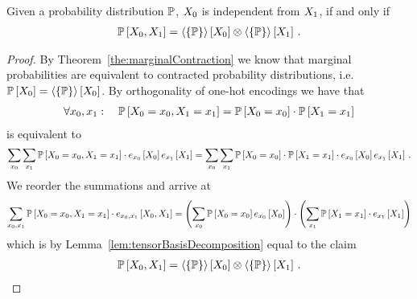 \begin{theorem}\label{the:independenceProductCriterion}
	Given a probability distribution $\mathbb{P}$, $X_{0}$ is independent from $X_{1}$, if and only if 
	\begin{align*}
		\mathbb{P}\left[X_{0},X_{1}\right] = \left\langle \{\mathbb{P}\}\right\rangle \left[ X_{0} \right] \otimes  \left\langle \{\mathbb{P}\}\right\rangle \left[ X_{1} \right] \, . 
	\end{align*}
\end{theorem}
\begin{proof}
	By Theorem~\ref{the:marginalContraction} we know that marginal probabilities are equivalent to contracted probability distributions, i.e. $\mathbb{P}\left[X_{0}\right] = \left\langle \{\mathbb{P}\}\right\rangle \left[ X_{0} \right] $.
	By orthogonality of one-hot encodings we have that
	\begin{align*}
		\forall x_{0}, x_{1} : \quad  \mathbb{P}\left[X_{0}=x_{0},X_{1}=x_{1}\right] 
		= \mathbb{P}\left[X_{0}=x_{0}\right]
		 \cdot 
		 \mathbb{P}\left[X_{1}=x_{1}\right] 
	\end{align*}
	is equivalent to 
	\begin{align*}
		\sum_{x_{0}}\sum_{x_{1}} \mathbb{P}\left[X_{0}=x_{0},X_{1}=x_{1}\right] \cdot e_{x_{0}}\left[X_{0}\right]e_{x_{1}}\left[X_{1}\right]
		= \sum_{x_{0}}\sum_{x_{1}} 
		\mathbb{P}\left[X_{0}=x_{0}\right]
		 \cdot 
		 \mathbb{P}\left[X_{1}=x_{1}\right] \cdot e_{x_{0}}\left[X_{0}\right]e_{x_{1}}\left[X_{1}\right] \, .
	\end{align*}
	We reorder the summations and arrive at
	\begin{align*}
		\sum_{x_{0},x_{1}} 
		\mathbb{P}\left[X_{0}=x_{0},X_{1}=x_{1}\right] \cdot e_{x_{0},x_{1}}\left[X_{0}, X_{1}\right]
		= \left(\sum_{x_{0}}\mathbb{P}\left[X_{0}=x_{0}\right] e_{x_{0}}\left[X_{0}\right] \right)
		\cdot 
		\left( \sum_{x_{1}}  \mathbb{P}\left[X_{1}=x_{1}\right] \cdot e_{x_{1}}\left[X_{1}\right]  \right) 
	\end{align*}
	which is by Lemma~\ref{lem:tensorBasisDecomposition} equal to the claim
	\begin{align*}
		\mathbb{P}\left[X_{0},X_{1}\right] = \left\langle \{\mathbb{P}\}\right\rangle \left[ X_{0} \right] \otimes  \left\langle \{\mathbb{P}\}\right\rangle \left[ X_{1} \right] \, . 
	\end{align*}
\end{proof}



